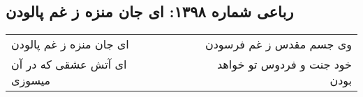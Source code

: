 \begin{center}
\section*{رباعی شماره ۱۳۹۸: ای جان منزه ز غم پالودن}
\label{sec:1398}
\begin{longtable}{l p{0.5cm} r}
ای جان منزه ز غم پالودن
&&
وی جسم مقدس ز غم فرسودن
\\
ای آتش عشقی که در آن میسوزی
&&
خود جنت و فردوس تو خواهد بودن
\\
\end{longtable}
\end{center}
